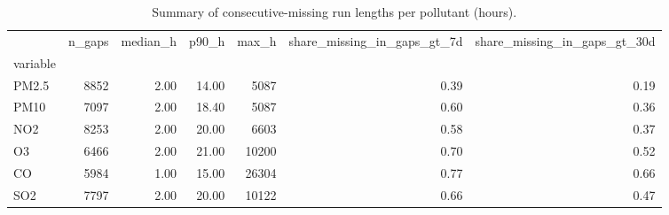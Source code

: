 \begin{table}
\caption{Summary of consecutive-missing run lengths per pollutant (hours).}
\label{tab:gap_lengths}
\begin{tabular}{lrrrrrr}
\toprule
 & n\_gaps & median\_h & p90\_h & max\_h & share\_missing\_in\_gaps\_gt\_7d & share\_missing\_in\_gaps\_gt\_30d \\
variable &  &  &  &  &  &  \\
\midrule
PM2.5 & 8852 & 2.00 & 14.00 & 5087 & 0.39 & 0.19 \\
PM10 & 7097 & 2.00 & 18.40 & 5087 & 0.60 & 0.36 \\
NO2 & 8253 & 2.00 & 20.00 & 6603 & 0.58 & 0.37 \\
O3 & 6466 & 2.00 & 21.00 & 10200 & 0.70 & 0.52 \\
CO & 5984 & 1.00 & 15.00 & 26304 & 0.77 & 0.66 \\
SO2 & 7797 & 2.00 & 20.00 & 10122 & 0.66 & 0.47 \\
\bottomrule
\end{tabular}
\end{table}
